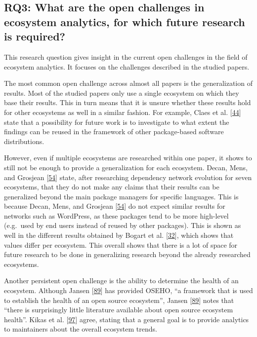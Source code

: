 \documentclass[]{book}
\begin{document}
\subsection{RQ3: What are the open challenges in ecosystem analytics,
for which future research is
required?}\label{rq3-what-are-the-open-challenges-in-ecosystem-analytics-for-which-future-research-is-required}

This research question gives insight in the current open challenges in
the field of ecosystem analytics. It focuses on the challenges described
in the studied papers.

The most common open challenge across almost all papers is the
generalization of results. Most of the studied papers only use a single
ecosystem on which they base their results. This in turn means that it
is unsure whether these results hold for other ecosystems as well in a
similar fashion. For example, Claes et al.
{[}\protect\hyperlink{ref-Claes2015}{44}{]} state that a possibility for
future work is to investigate to what extent the findings can be reused
in the framework of other package-based software distributions.

However, even if multiple ecosystems are researched within one paper, it
shows to still not be enough to provide a generalization for each
ecosystem. Decan, Mens, and Grosjean
{[}\protect\hyperlink{ref-Decan2018}{54}{]} state, after researching
dependency network evolution for seven ecosystems, that they do not make
any claims that their results can be generalized beyond the main package
managers for specific languages. This is because Decan, Mens, and
Grosjean {[}\protect\hyperlink{ref-Decan2018}{54}{]} do not expect
similar results for networks such as WordPress, as these packages tend
to be more high-level (e.g.~used by end users instead of reused by other
packages). This is shown as well in the different results obtained by
Bogart et al. {[}\protect\hyperlink{ref-Bogart2016}{32}{]}, which shows
that values differ per ecosystem. This overall shows that there is a lot
of space for future research to be done in generalizing research beyond
the already researched ecosystems.

Another persistent open challenge is the ability to determine the health
of an ecosystem. Although Jansen
{[}\protect\hyperlink{ref-Jansen2014}{89}{]} has provided OSEHO, ``a
framework that is used to establish the health of an open source
ecosystem'', Jansen {[}\protect\hyperlink{ref-Jansen2014}{89}{]} notes
that ``there is surprisingly little literature available about open
source ecosystem health''. Kikas et al.
{[}\protect\hyperlink{ref-Kikas2017}{97}{]} agree, stating that a
general goal is to provide analytics to maintainers about the overall
ecosystem trends.
\end{document}

